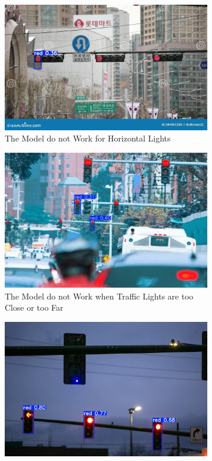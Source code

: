 \documentclass[journal,transmag]{IEEEtran}
\begin{document}
\begin{figure}[h]
    \centering
    \begin{subfigure}[b]{0.3\textwidth}
        \includegraphics[width=\textwidth]{Result_2.png}
        \caption{The Model do not Work for Horizontal Lights}
        \label{fig:sub1}
    \end{subfigure}
    \hfill
    \begin{subfigure}[b]{0.3\textwidth}
        \includegraphics[width=\textwidth]{Result_3.png}
        \caption{The Model do not Work when Traffic Lights are too Close or too Far}
        \label{fig:sub2}
    \end{subfigure}
    \hfill
    \begin{subfigure}[b]{0.3\textwidth}
        \includegraphics[width=\textwidth]{Result_4.png}

\end{subfigure}
\end{figure}
\end{document}
